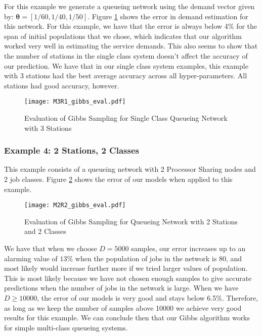 \documentclass[a4paper,11pt,titlepage]{article}
\begin{document}
For this example we generate a queueing network using the demand vector given by: $\bm{\theta} = [1/60,1/40,1/50]$. Figure \ref{fig:M3R1_eval_gibbs} shows the error in demand estimation for this network. For this example, we have that the error is always below 4\% for the span of initial populations that we chose, which indicates that our algorithm worked very well in estimating the service demands. This also seems to show that the number of stations in the single class system doesn't affect the accuracy of our prediction. We have that in our single class system examples, this example with 3 stations had the best average accuracy across all hyper-parameters. All stations had good accuracy, however. 

\begin{figure}[h!]
\begin{center}
\texttt{[image: M3R1\_gibbs\_eval.pdf]}
\caption{Evaluation of Gibbs Sampling for Single Class Queueing Network with 3 Stations}
\label{fig:M3R1_eval_gibbs}
\end{center}
\end{figure}

\subsubsection{Example 4: 2 Stations, 2 Classes}

This example consists of a queueing network with 2 Processor Sharing nodes and 2 job classes. Figure \ref{fig:M2R2_eval_gibbs} shows the error of our models when applied to this example. \\

\begin{figure}[h!]
\begin{center}
\texttt{[image: M2R2\_gibbs\_eval.pdf]}
\caption{Evaluation of Gibbs Sampling for Queueing Network with 2 Stations and 2 Classes}
\label{fig:M2R2_eval_gibbs}
\end{center}
\end{figure}

We have that when we choose $D = 5000$ samples, our error increases up to an alarming value of $13\%$ when the population of jobs in the network is 80, and most likely would increase further more if we tried larger values of population. This is most likely because we have not chosen enough samples to give accurate predictions when the number of jobs in the network is large. When we have $D \geq 10000$, the error of our models is very good and stays below 6.5\%. Therefore, as long as we keep the number of samples above 10000 we achieve very good results for this example. We can conclude then that our Gibbs algorithm works for simple multi-class queueing systems. 
\end{document}
